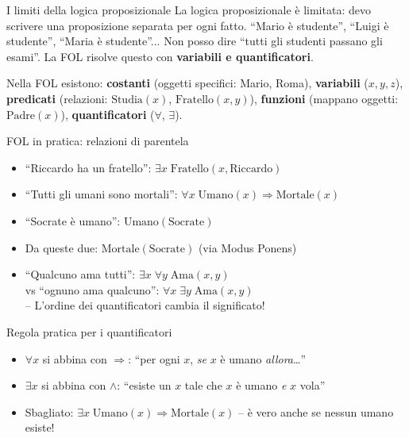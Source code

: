 \documentclass[12pt,a4paper]{article}
\begin{document}
\begin{narrativo}{I limiti della logica proposizionale}
La logica proposizionale è limitata: devo scrivere una proposizione separata per ogni fatto. ``Mario è studente'', ``Luigi è studente'', ``Maria è studente''... Non posso dire ``tutti gli studenti passano gli esami''. La FOL risolve questo con \textbf{variabili e quantificatori}.

Nella FOL esistono: \textbf{costanti} (oggetti specifici: Mario, Roma), \textbf{variabili} ($x, y, z$), \textbf{predicati} (relazioni: $\text{Studia}(x)$, $\text{Fratello}(x,y)$), \textbf{funzioni} (mappano oggetti: $\text{Padre}(x)$), \textbf{quantificatori} ($\forall$, $\exists$).
\end{narrativo}

\begin{esempio}{FOL in pratica: relazioni di parentela}
\begin{itemize}[noitemsep]
  \item ``Riccardo ha un fratello'': $\exists x\; \text{Fratello}(x, \text{Riccardo})$
  \item ``Tutti gli umani sono mortali'': $\forall x\; \text{Umano}(x) \Rightarrow \text{Mortale}(x)$
  \item ``Socrate è umano'': $\text{Umano}(\text{Socrate})$
  \item Da queste due: $\text{Mortale}(\text{Socrate})$ (via Modus Ponens)
  \item ``Qualcuno ama tutti'': $\exists x\; \forall y\; \text{Ama}(x, y)$ \\
    vs ``ognuno ama qualcuno'': $\forall x\; \exists y\; \text{Ama}(x, y)$ \\ -- L'ordine dei quantificatori cambia il significato!
\end{itemize}
\end{esempio}

\begin{ricorda}{Regola pratica per i quantificatori}
\begin{itemize}[noitemsep]
  \item $\forall x$ si abbina con $\Rightarrow$: ``per ogni $x$, \emph{se} $x$ è umano \emph{allora}\ldots''
  \item $\exists x$ si abbina con $\land$: ``esiste un $x$ tale che $x$ è umano \emph{e} $x$ vola''
  \item Sbagliato: $\exists x\; \text{Umano}(x) \Rightarrow \text{Mortale}(x)$ -- è vero anche se nessun umano esiste!
\end{itemize}
\end{ricorda}
\end{document}
